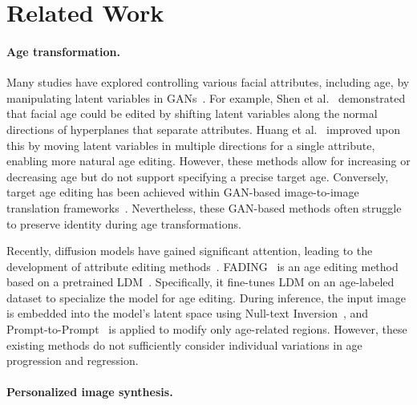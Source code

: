 \section{Related Work}
\label{sec:related}

\paragraph{Age transformation.}
Many studies have explored controlling various facial attributes, including age, by manipulating latent variables in GANs~\cite{shen2020interpreting,wu2021stylespace,patashnik2021styleclip,parihar2022everything,huang2023adaptive,nitzan2022large,harkonen2020ganspace}.
For example, Shen et al.~\cite{shen2020interpreting} demonstrated that facial age could be edited by shifting latent variables along the normal directions of hyperplanes that separate attributes.
Huang et al.~\cite{huang2023adaptive} improved upon this by moving latent variables in multiple directions for a single attribute, enabling more natural age editing.
However, these methods allow for increasing or decreasing age but do not support specifying a precise target age.
Conversely, target age editing has been achieved within GAN-based image-to-image translation frameworks~\cite{or2020lifespan,alaluf2021only,gomez2022custom,yao2021high,DBLP:journals/vc/ItoEK23}.
Nevertheless, these GAN-based methods often struggle to preserve identity during age transformations.

Recently, diffusion models have gained significant attention, leading to the development of attribute editing methods~\cite{baumann2024continuous,kwon2022diffusion,li2023pluralistic,chen2023face}.
FADING~\cite{chen2023face} is an age editing method based on a pretrained LDM~\cite{rombach2022high}.
Specifically, it fine-tunes LDM on an age-labeled dataset to specialize the model for age editing.
During inference, the input image is embedded into the model's latent space using Null-text Inversion~\cite{mokady2023null}, and Prompt-to-Prompt~\cite{hertz2022prompt} is applied to modify only age-related regions.
However, these existing methods do not sufficiently consider individual variations in age progression and regression.

\paragraph{Personalized image synthesis.}

